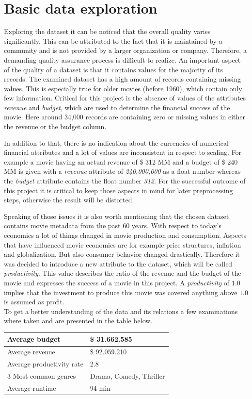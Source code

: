 \section{Basic data exploration}
\label{sec:data_exploration}
Exploring the dataset it can be noticed that the overall quality varies significantly. This can be attributed to the fact that it is maintained by a community and is not provided by a larger organization or company. Therefore, a demanding quality assurance process is difficult to realize. An important aspect of the quality of a dataset is that it contains values for the majority of its records. The examined dataset has a high amount of records containing missing values. This is especially true for older movies (before 1960), which contain only few information. Critical for this project is the absence of values of the attributes \textit{revenue} and \textit{budget}, which are used to determine the financial success of the movie. Here around 34,000 records are containing zero or missing values in either the revenue or the budget column.

In addition to that, there is no indication about the currencies of numerical financial attributes and a lot of values are inconsistent in respect to scaling. For example a movie having an actual revenue of \$ 312 MM and a budget of \$ 240 MM is given with a \textit{revenue} attribute of \textit{240,000,000} as a float number whereas the \textit{budget} attribute contains the float number \textit{312}. For the successful outcome of this project it is critical to keep those aspects in mind for later preprocessing steps, otherwise the result will be distorted.

Speaking of those issues it is also worth mentioning that the chosen dataset contains movie metadata from the past 60 years. With respect to today's economics a lot of things changed in movie production and consumption. Aspects that have influenced movie economics are for example price structures, inflation and globalization. But also consumer behavior changed drastically. Therefore it was decided to introduce a new attribute to the dataset, which will be called \textit{productivity}. This value describes the ratio of the revenue and the budget of the movie and expresses the success of a movie in this project. A \textit{productivity} of $1.0$ implies that the investment to produce this movie was covered anything above $1.0$ is assumed as profit.
\\

To get a better understanding of the data and its relations a few examinations where taken and are presented in the table below.
\begin{center}
	\begin{tabular}{| l | l |}
	\hline
	Average budget & \$ 31.662.585 \\ \hline
	Average revenue & \$ 92.059.210 \\ \hline
	Average productivity rate & 2.8 \\ \hline
	3 Most common genres & Drama, Comedy, Thriller \\ \hline
	Average runtime & 94 min \\ \hline
	\end{tabular}
\end{center} 